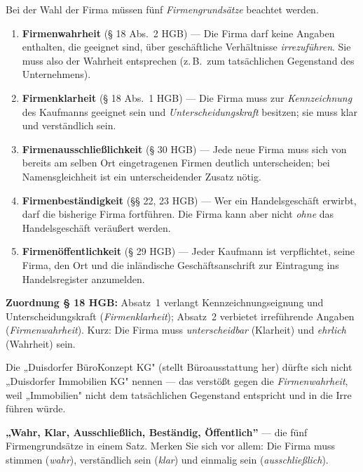 \documentclass[11pt, a4paper]{article}
\begin{document}
Bei der Wahl der Firma müssen fünf \emph{Firmengrundsätze} beachtet werden.

\begin{enumerate}
  \item \textbf{Firmenwahrheit} (§ 18 Abs.\ 2 HGB) --- Die Firma darf keine Angaben
    enthalten, die geeignet sind, über geschäftliche Verhältnisse \emph{irrezuführen}. Sie
    muss also der Wahrheit entsprechen (z.\,B.\ zum tatsächlichen Gegenstand des
    Unternehmens).
  \item \textbf{Firmenklarheit} (§ 18 Abs.\ 1 HGB) --- Die Firma muss zur \emph{Kennzeichnung}
    des Kaufmanns geeignet sein und \emph{Unterscheidungskraft} besitzen; sie muss klar und
    verständlich sein.
  \item \textbf{Firmenausschließlichkeit} (§ 30 HGB) --- Jede neue Firma muss sich von
    bereits am selben Ort eingetragenen Firmen deutlich unterscheiden; bei Namens\-gleichheit
    ist ein unterscheidender Zusatz nötig.
  \item \textbf{Firmenbeständigkeit} (§§ 22, 23 HGB) --- Wer ein Handelsgeschäft erwirbt,
    darf die bisherige Firma fortführen. Die Firma kann aber nicht \emph{ohne} das
    Handelsgeschäft veräußert werden.
  \item \textbf{Firmenöffentlichkeit} (§ 29 HGB) --- Jeder Kaufmann ist verpflichtet,
    seine Firma, den Ort und die inländische Geschäftsanschrift zur Eintragung ins
    Handelsregister anzumelden.
\end{enumerate}

\begin{merksatz}
\textbf{Zuordnung § 18 HGB:} Absatz~1 verlangt Kennzeichnungs\-eignung und Unterscheidungs\-kraft
(\emph{Firmenklarheit}); Absatz~2 verbietet irreführende Angaben (\emph{Firmenwahrheit}).
Kurz: Die Firma muss \emph{unterscheidbar} (Klarheit) und \emph{ehrlich} (Wahrheit) sein.
\end{merksatz}

\begin{beispiel}
Die „Duisdorfer BüroKonzept KG" (stellt Büroausstattung her) dürfte sich nicht
„Duisdorfer Immobilien KG" nennen --- das verstößt gegen die \emph{Firmenwahrheit}, weil
„Immobilien" nicht dem tatsächlichen Gegenstand entspricht und in die Irre führen würde.
\end{beispiel}

\begin{eselsbruecke}
\textbf{„Wahr, Klar, Ausschließlich, Beständig, Öffentlich”} --- die fünf Firmen\-grundsätze
in einem Satz. Merken Sie sich vor allem: Die Firma muss stimmen (\emph{wahr}), verständlich
sein (\emph{klar}) und einmalig sein (\emph{ausschließlich}).
\end{eselsbruecke}
\end{document}
